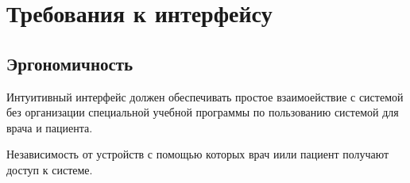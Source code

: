 \section{Требования к интерфейсу}
\subsection{Эргономичность}

Интуитивный интерфейс должен обеспечивать простое взаимоействие с системой без
организации специальной учебной программы по пользованию системой для врача и
пациента. 

Независимость от устройств с помощью которых врач иили пациент получают
доступ к системе.
